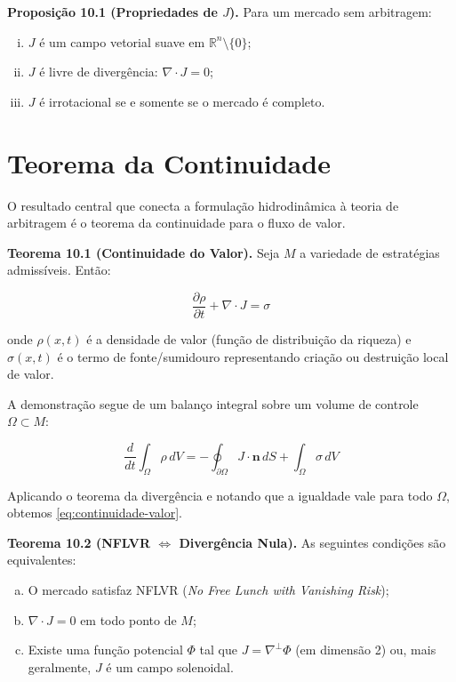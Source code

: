 \smallskip
\noindent\textbf{Proposi\c{c}\~ao 10.1 (Propriedades de $J$).} Para um mercado sem arbitragem:
\begin{enumerate}[(i)]
 \item $J$ \'e um campo vetorial suave em $\mathbb{R}^n \setminus \{0\}$;
 \item $J$ \'e livre de diverg\^encia: $\nabla \cdot J = 0$;
 \item $J$ \'e irrotacional se e somente se o mercado \'e completo.
\end{enumerate}

\section{Teorema da Continuidade}

O resultado central que conecta a formula\c{c}\~ao hidrodin\^amica \`a teoria de arbitragem \'e o teorema da continuidade para o fluxo de valor.

\smallskip
\noindent\textbf{Teorema 10.1 (Continuidade do Valor).} Seja $M$ a variedade de estrat\'egias admiss\'iveis. Ent\~ao:

\begin{equation}\label{eq:continuidade-valor}
\frac{\partial \rho}{\partial t} + \nabla \cdot J = \sigma
\end{equation}

onde $\rho(x,t)$ \'e a densidade de valor (fun\c{c}\~ao de distribui\c{c}\~ao da riqueza) e $\sigma(x,t)$ \'e o termo de fonte/sumidouro representando cria\c{c}\~ao ou destrui\c{c}\~ao local de valor.

A demonstra\c{c}\~ao segue de um balan\c{c}o integral sobre um volume de controle $\Omega \subset M$:

\begin{equation}\label{eq:balanco-integral}
\frac{d}{dt} \int_\Omega \rho \, dV = - \oint_{\partial\Omega} J \cdot \mathbf{n} \, dS + \int_\Omega \sigma \, dV
\end{equation}

Aplicando o teorema da diverg\^encia e notando que a igualdade vale para todo $\Omega$, obtemos \eqref{eq:continuidade-valor}.

\medskip
\noindent\textbf{Teorema 10.2 (NFLVR $\Leftrightarrow$ Diverg\^encia Nula).} As seguintes condi\c{c}\~oes s\~ao equivalentes:

\begin{enumerate}[(a)]
 \item O mercado satisfaz NFLVR (\textit{No Free Lunch with Vanishing Risk});
 \item $\nabla \cdot J = 0$ em todo ponto de $M$;
 \item Existe uma fun\c{c}\~ao potencial $\Phi$ tal que $J = \nabla^\perp \Phi$ (em dimens\~ao 2) ou, mais geralmente, $J$ \'e um campo solenoidal.
\end{enumerate}


